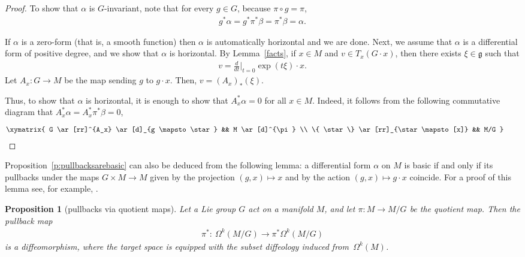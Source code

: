 \documentclass[11pt]{article}
\numberwithin{equation}{section}
\newtheorem{Proposition}[Theorem]{Proposition}
\newcommand{\g}{{\mathfrak{g}}} %
\newcommand{\hypref}[2]{{#2~\ref{#1}}}
\begin{document}
\begin{proof}
To show that $\alpha$ is $G$-invariant, note that for every $g \in G$, because $\pi\circ g=\pi$,
\begin{gather*}
g^* \alpha = g^* \pi^* \beta = \pi^* \beta = \alpha.
\end{gather*}

If $\alpha$ is a zero-form (that is, a smooth function)
then $\alpha$ is automatically horizontal and we are done.
Next, we assume that $\alpha$ is a dif\/ferential form of positive degree,
and we show that $\alpha$ is horizontal.
By Lemma~\ref{facts}, if $x\in M$ and $v\in T_x(G\cdot x)$, then there exists
$\xi\in\g$ such that
\begin{gather*}v=\frac{d}{dt}\Big|_{t=0}\exp(t\xi) \cdot x .\end{gather*}
Let $A_x\colon G\to M$ be the map sending $g$ to $g\cdot x$. Then, $v=(A_x)_*(\xi)$.

Thus, to show that $\alpha$ is horizontal, it is enough to show that $A_x^*\alpha=0$ for all $x\in M$. Indeed, it follows from the following commutative diagram that $A_x^*\alpha=A_x^*\pi^*\beta=0$,
\begin{gather*}
\begin{gathered}[b]
\xymatrix{
 G \ar[rr]^{A_x} \ar[d]_{g \mapsto \star} && M \ar[d]^{\pi} \\
 \{ \star \} \ar[rr]_{\star \mapsto [x]} && M/G
}\\[-17pt]
\null
\end{gathered}\tag*{\qed}
\end{gather*}
 \renewcommand{\qed}{}
\end{proof}

\begin{Remark}
\hypref{p:pullbacksarebasic}{Proposition} can also be deduced
from the following lemma:
a dif\/ferential form $\alpha$ on $M$ is basic
if and only if its pullbacks under the maps $G \times M \to M$
given by the projection $(g,x)\mapsto x$
and by the action $(g,x) \mapsto g\cdot x$ coincide.
For a proof of this lemma see, for example,
\cite[Lemma~3.3]{watts-groupoids}.
\end{Remark}

\begin{Proposition}[pullbacks via quotient maps]
\label{p:injectivity}
Let a Lie group $G$ act on a manifold $M$,
and let $\pi \colon M \to M/G$ be the quotient map.
Then the pullback map
\begin{gather*} \pi^* \colon \ \Omega^k(M/G) \to \pi^*\Omega^k(M/G) \end{gather*}
is a diffeomorphism,
where the target space is equipped with the subset diffeology
induced \linebreak from~$\Omega^k(M)$.
\end{Proposition}
\end{document}
